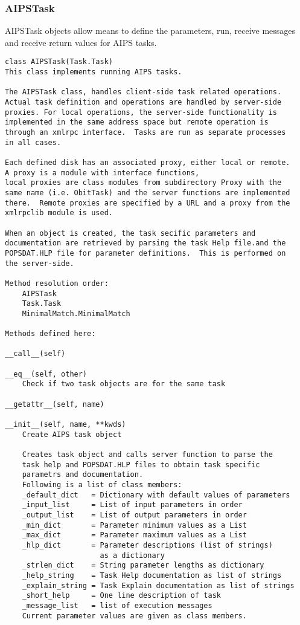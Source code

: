 \documentclass[11pt]{report}
\begin{document}
\subsubsection{AIPSTask}
AIPSTask objects allow means to define the parameters,
run, receive messages and receive return values for AIPS tasks.
\begin{verbatim}
class AIPSTask(Task.Task)
This class implements running AIPS tasks.

The AIPSTask class, handles client-side task related operations.
Actual task definition and operations are handled by server-side
proxies. For local operations, the server-side functionality is
implemented in the same address space but remote operation is
through an xmlrpc interface.  Tasks are run as separate processes
in all cases.

Each defined disk has an associated proxy, either local or remote.
A proxy is a module with interface functions,
local proxies are class modules from subdirectory Proxy with the
same name (i.e. ObitTask) and the server functions are implemented
there.  Remote proxies are specified by a URL and a proxy from the
xmlrpclib module is used.

When an object is created, the task secific parameters and
documentation are retrieved by parsing the task Help file.and the
POPSDAT.HLP file for parameter definitions.  This is performed on
the server-side.

Method resolution order:
    AIPSTask
    Task.Task
    MinimalMatch.MinimalMatch

Methods defined here:

__call__(self)

__eq__(self, other)
    Check if two task objects are for the same task

__getattr__(self, name)

__init__(self, name, **kwds)
    Create AIPS task object
    
    Creates task object and calls server function to parse the
    task help and POPSDAT.HLP files to obtain task specific
    parametrs and documentation.
    Following is a list of class members:
    _default_dict   = Dictionary with default values of parameters
    _input_list     = List of input parameters in order
    _output_list    = List of output parameters in order
    _min_dict       = Parameter minimum values as a List
    _max_dict       = Parameter maximum values as a List
    _hlp_dict       = Parameter descriptions (list of strings)
                      as a dictionary
    _strlen_dict    = String parameter lengths as dictionary
    _help_string    = Task Help documentation as list of strings
    _explain_string = Task Explain documentation as list of strings
    _short_help     = One line description of task
    _message_list   = list of execution messages
    Current parameter values are given as class members.


\end{verbatim}
\end{document}
